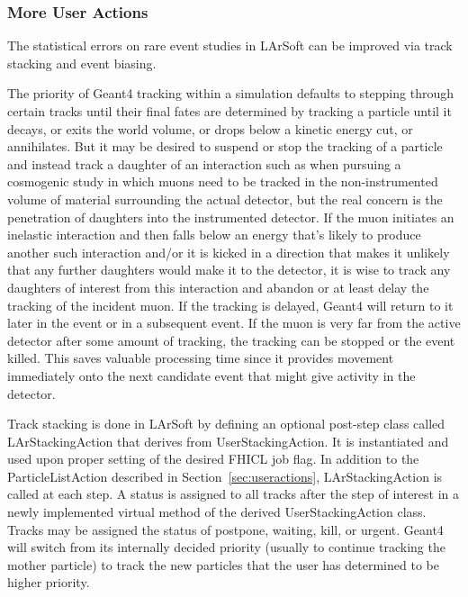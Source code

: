 \documentclass[12pt]{elsarticle}
\begin{document}
\begin{itemize}
\end{itemize}

\subsubsection{More User Actions}
\label{susubsec:trackstackingandeventbiasing}

The statistical errors on rare event studies in LArSoft can be improved via track stacking and event biasing.

The priority of Geant4 tracking within a simulation defaults to stepping through certain tracks
until their final fates are determined by tracking a particle until it decays, or exits the world volume, or drops below a kinetic
energy cut, or annihilates. But it may be desired to suspend or stop 
the tracking of a particle and instead track a daughter of an interaction such as when pursuing a cosmogenic study in which muons need to be tracked in 
the non-instrumented volume of material surrounding the actual detector, but the real concern is the penetration of daughters into the instrumented detector. If the muon initiates an inelastic interaction and then falls below 
an energy that's likely to produce another such interaction and/or it is kicked in a direction that makes
it unlikely that any further daughters would make it to the detector, it is wise to
track any daughters of interest from this interaction and abandon or at least delay the tracking of the incident muon.
If the tracking is delayed, Geant4 will return to it later in the event or in a subsequent event. If the muon is very far from the active detector after some amount of tracking, the tracking can be stopped or the event killed. This saves valuable processing time since it provides movement
immediately onto the next candidate event that might give activity in the detector.

Track stacking is done in LArSoft by defining an optional post-step class 
called LArStackingAction that derives from UserStackingAction. It is instantiated and used upon proper setting of the desired 
FHICL job flag. In addition to the ParticleListAction 
described in Section~\ref{sec:useractions}, LArStackingAction is called at each step.
A status is assigned to all 
tracks after the step of interest in a 
newly implemented virtual method of the derived UserStackingAction class. 
Tracks may be assigned the status of
postpone, waiting, kill, or urgent. Geant4 will switch from its internally decided priority (usually to continue tracking the mother particle) to track the new particles that
the user has determined to be higher priority. 
\end{document}

